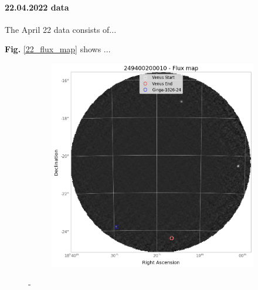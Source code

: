     \paragraph{22.04.2022 data}

    The April 22 data consists of...
    
    \textbf{Fig.} \ref{22_flux_map} shows ...
    
        \begin{figure}[H]
        \centering
        \begin{subfigure}{.3\textwidth}
            \includegraphics[width=\textwidth]{report/Figures/methods/2204/20_map.png}
        \end{subfigure}%
        \hspace{1em}-
        \begin{subfigure}{.3\textwidth}
            \centering

\end{subfigure}
\end{figure}
